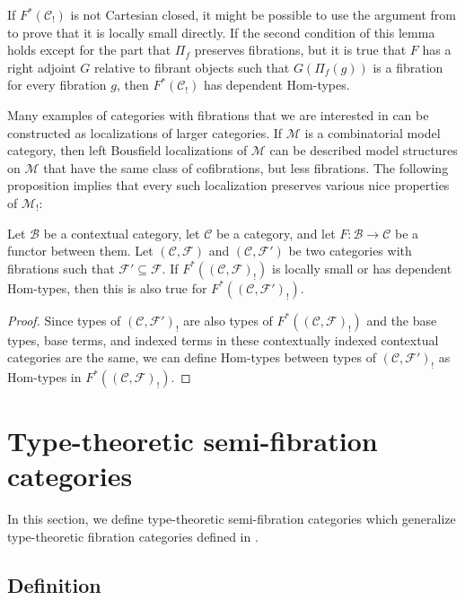 \documentclass[reqno]{amsart}
\theoremstyle{definition}
\theoremstyle{remark}
\newcommand{\fs}[1]{\mathrm{#1}}
\newcommand{\scat}[1]{\mathcal{#1}}
\newcommand{\Fib}{\mathcal{F}}
\newcommand{\Hom}{\fs{Hom}}
\numberwithin{figure}{section}
\begin{document}
\begin{remark}
If $F^*(\scat{C}_!)$ is not Cartesian closed, it might be possible to use the argument from  to prove that it is locally small directly.
If the second condition of this lemma holds except for the part that $\Pi_f$ preserves fibrations,
but it is true that $F$ has a right adjoint $G$ relative to fibrant objects such that $G(\Pi_f(g))$ is a fibration for every fibration $g$, then $F^*(\scat{C}_!)$ has dependent $\Hom$-types.
\end{remark}

Many examples of categories with fibrations that we are interested in can be constructed as localizations of larger categories.
If $\scat{M}$ is a combinatorial model category, then left Bousfield localizations of $\scat{M}$ can be described model structures on $\scat{M}$ that have the same class of cofibrations, but less fibrations.
The following proposition implies that every such localization preserves various nice properties of $\scat{M}_!$:

\begin{prop}
Let $\scat{B}$ be a contextual category, let $\scat{C}$ be a category, and let $F : \scat{B} \to \scat{C}$ be a functor between them.
Let $(\scat{C},\Fib)$ and $(\scat{C},\Fib')$ be two categories with fibrations such that $\Fib' \subseteq \Fib$.
If $F^*((\scat{C},\Fib)_!)$ is locally small or has dependent $\Hom$-types, then this is also true for $F^*((\scat{C},\Fib')_!)$.
\end{prop}
\begin{proof}
Since types of $(\scat{C},\Fib')_!$ are also types of $F^*((\scat{C},\Fib)_!)$ and the base types, base terms, and indexed terms in these contextually indexed contextual categories are the same,
we can define $\Hom$-types between types of $(\scat{C},\Fib')_!$ as $\Hom$-types in $F^*((\scat{C},\Fib)_!)$.
\end{proof}

\section{Type-theoretic semi-fibration categories}
\label{sec:ttsfc}

In this section, we define type-theoretic semi-fibration categories which generalize type-theoretic fibration categories defined in \cite[Definition~2.1]{shul-inv}.

\subsection{Definition}
\end{document}
